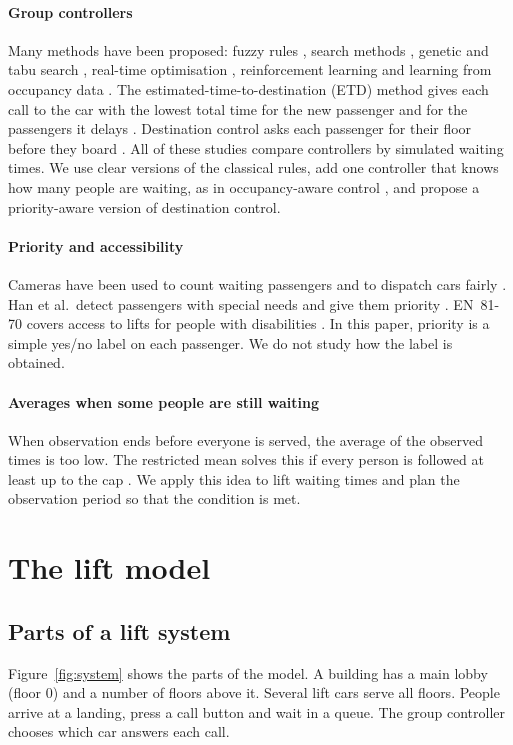 \paragraph{Group controllers} Many methods have been proposed: fuzzy rules \cite{kim1995,fernandez2014}, search methods \cite{hamdi2007}, genetic and tabu search \cite{cortes2004,bolat2011,cortes2021}, real-time optimisation \cite{utgoff2012}, reinforcement learning \cite{crites1998,wan2024} and learning from occupancy data \cite{wang2021}. The estimated-time-to-destination (ETD) method gives each call to the car with the lowest total time for the new passenger and for the passengers it delays \cite{smith2002}. Destination control asks each passenger for their floor before they board \cite{sorsa2018}. All of these studies compare controllers by simulated waiting times. We use clear versions of the classical rules, add one controller that knows how many people are waiting, as in occupancy-aware control \cite{wang2021,kimmoon2001}, and propose a priority-aware version of destination control.

\paragraph{Priority and accessibility} Cameras have been used to count waiting passengers \cite{kimmoon2001} and to dispatch cars fairly \cite{yamauchi2019}. Han et al.\ detect passengers with special needs and give them priority \cite{han2024}. EN~81-70 covers access to lifts for people with disabilities \cite{en8170}. In this paper, priority is a simple yes/no label on each passenger. We do not study how the label is obtained.

\paragraph{Averages when some people are still waiting} When observation ends before everyone is served, the average of the observed times is too low. The restricted mean solves this if every person is followed at least up to the cap \cite{royston2013}. We apply this idea to lift waiting times and plan the observation period so that the condition is met.

\section{The lift model}\label{sec:model}

\subsection{Parts of a lift system}
Figure~\ref{fig:system} shows the parts of the model. A building has a main lobby (floor 0) and a number of floors above it. Several lift cars serve all floors. People arrive at a landing, press a call button and wait in a queue. The group controller chooses which car answers each call.

